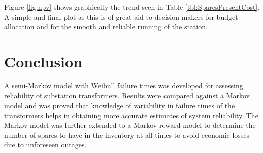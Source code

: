 \documentclass[letterpaper, 12pt]{article}
\begin{document}
Figure \ref{fig:npv} shows graphically the trend seen in Table \ref{tbl:SparesPresentCost}. A simple and final plot as this is of great aid to decision makers for budget allocation and for the smooth and reliable running of the station.


\section{Conclusion}
A semi-Markov model with Weibull failure times was developed for assessing reliability of substation transformers. Results were compared against a Markov model and was proved that knowledge of variability in failure times of the transformers helps in obtaining more accurate estimates of system reliability. The Markov model was further extended to a Markov reward model to determine the number of spares to have in the inventory at all times to avoid economic losses due to unforeseen outages.








\end{document}
